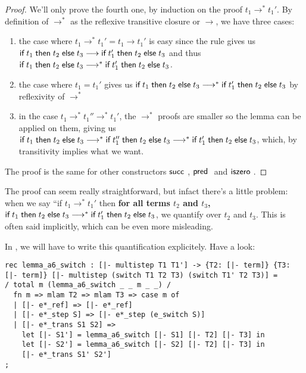 \begin{proof}
  We'll only prove the fourth one, by induction on the proof
  $t_1 \longrightarrow^* t_1'$. By definition of $\longrightarrow^*$ as the
  reflexive transitive closure or $\longrightarrow$, we have three cases:
  \begin{enumerate}
    \item the case where $t_1 \rightarrow^* t_1' = t_1 \rightarrow t_1'$
      is easy since the \EIf rule gives us $\textsf{if\;} t_1 \textsf{\;then\;} t_2 \textsf{\;else\;} t_3
      \longrightarrow \textsf{if\;} t_1' \textsf{\;then\;} t_2 \textsf{\;else\;} t_3$ and thus $\textsf{if\;} t_1 \textsf{\;then\;} t_2 \textsf{\;else\;} t_3
      \longrightarrow^* \textsf{if\;} t_1' \textsf{\;then\;} t_2 \textsf{\;else\;} t_3$.
      
    \item the case where $t_1 = t_1'$ gives us
      $\textsf{if\;} t_1 \textsf{\;then\;} t_2 \textsf{\;else\;} t_3 \longrightarrow^* \textsf{if\;} t_1' \textsf{\;then\;} t_2 \textsf{\;else\;} t_3$ by
      reflexivity of $\rightarrow^*$
    
    \item in the case $t_1 \rightarrow^* t_1'' \rightarrow^* t_1'$,
      the $\rightarrow^*$ proofs are smaller so the lemma can be applied on
      them, giving us $\textsf{if\;} t_1 \textsf{\;then\;} t_2 \textsf{\;else\;} t_3 \longrightarrow^*
      \textsf{if\;} t_1'' \textsf{\;then\;} t_2 \textsf{\;else\;} t_3 \longrightarrow^* \textsf{if\;} t_1' \textsf{\;then\;} t_2 \textsf{\;else\;} t_3$, which,
      by transitivity implies what we want.
  \end{enumerate}
  The proof is the same for other constructors $\tmsucc$, $\tmpred$ and
  $\tmiszero$.
\end{proof}

The \beluga proof can seem really straightforward, but infact there's a little
problem: when we say ``if $t_1 \rightarrow^* t_1'$ then {\bf for all terms
$t_2$ and $t_3$,} $\textsf{if\;} t_1 \textsf{\;then\;} t_2 \textsf{\;else\;} t_3 \longrightarrow^* \textsf{if\;} t_1' \textsf{\;then\;} t_2 \textsf{\;else\;} t_3$,
we quantify over $t_2$ and $t_3$. This is often said implicitly, which can be
even more misleading.

In \beluga, we will have to write this quantification explicitely. Have a look:

\begin{lstlisting}
rec lemma_a6_switch : [|- multistep T1 T1'] -> {T2: [|- term]} {T3: [|- term]} [|- multistep (switch T1 T2 T3) (switch T1' T2 T3)] =
/ total m (lemma_a6_switch _ _ m _ _) /
  fn m => mlam T2 => mlam T3 => case m of 
  | [|- e*_ref] => [|- e*_ref]
  | [|- e*_step S] => [|- e*_step (e_switch S)]
  | [|- e*_trans S1 S2] =>
    let [|- S1'] = lemma_a6_switch [|- S1] [|- T2] [|- T3] in
    let [|- S2'] = lemma_a6_switch [|- S2] [|- T2] [|- T3] in
    [|- e*_trans S1' S2']
;
\end{lstlisting}

